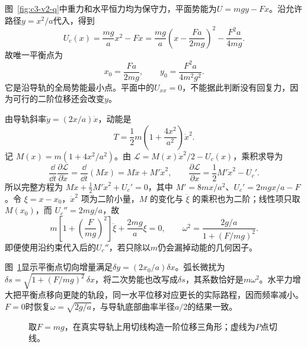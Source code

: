 \begin{solution}
图~\ref{fig:c3-v2-q}中重力和水平恒力均为保守力，平面势能为$U=mgy-Fx$。沿允许路径$y=x^2/a$代入，得到
\[U_c(x)=\frac{mg}{a}x^2-Fx
=\frac{mg}{a}\left(x-\frac{Fa}{2mg}\right)^2-\frac{F^2a}{4mg}.\]
故唯一平衡点为
\[\boxed{x_0=\frac{Fa}{2mg},\qquad y_0=\frac{F^2a}{4m^2g^2}}.\]
它是沿导轨的全局势能最小点。平面中的$U_{xx}=0$，不能据此判断没有回复力，因为可行的二阶位移还会改变$y$。

由导轨斜率$\dot y=(2x/a)\dot x$，动能是
\[T=\frac12m\left(1+\frac{4x^2}{a^2}\right)\dot x^2.
\]
记 $M(x)=m(1+4x^2/a^2)$。由 $\mathcal L=M(x)\dot x^2/2-U_c(x)$，乘积求导为
\[
\frac{\dd}{\dd t}\frac{\partial\mathcal L}{\partial\dot x}
=\frac{\dd}{\dd t}(M\dot x)=M\ddot x+M'\dot x^2,\qquad
\frac{\partial\mathcal L}{\partial x}=\frac12M'\dot x^2-U_c'.
\]
所以完整方程为 $M\ddot x+\tfrac12M'\dot x^2+U_c'=0$，其中 $M'=8mx/a^2$、$U_c'=2mgx/a-F$。令 $\xi=x-x_0$，$\dot x^2$ 项为二阶小量，$M$ 的变化与 $\ddot\xi$ 的乘积也为二阶；线性项只取 $M(x_0)$，而 $U_c''=2mg/a$，故
\[m\left[1+\left(\frac F{mg}\right)^2\right]\ddot\xi
+\frac{2mg}{a}\xi=0,\qquad
\boxed{\omega^2=\frac{2g/a}{1+(F/mg)^2}}.\]
即便使用沿约束代入后的$U_c''$，若只除以$m$仍会漏掉动能的几何因子。

图~\ref{fig:c3-v2-s}显示平衡点切向增量满足$\delta y=(2x_0/a)\delta x$。弧长微扰为$\delta s=\sqrt{1+(F/mg)^2}\,\delta x$，将二次势能也改写成$\delta s$，其系数恰好是$m\omega^2$。水平力增大把平衡点移向更陡的轨段，同一水平位移对应更长的实际路程，因而频率减小。$F=0$时恢复$\omega=\sqrt{2g/a}$，与导轨底部曲率半径$a/2$的结果一致。
\begin{figure}[H]\centering
{}
\caption{取$F=mg$，在真实导轨上用切线构造一阶位移三角形；虚线为$P$点切线。}\label{fig:c3-v2-s}
\end{figure}
\end{solution}


